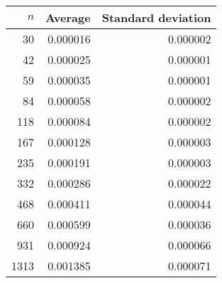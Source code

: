 \begin{tabular}{rrr}
$n$ & Average & Standard deviation\\\hline
30 & 0.000016 & 0.000002\\
42 & 0.000025 & 0.000001\\
59 & 0.000035 & 0.000001\\
84 & 0.000058 & 0.000002\\
118 & 0.000084 & 0.000002\\
167 & 0.000128 & 0.000003\\
235 & 0.000191 & 0.000003\\
332 & 0.000286 & 0.000022\\
468 & 0.000411 & 0.000044\\
660 & 0.000599 & 0.000036\\
931 & 0.000924 & 0.000066\\
1313 & 0.001385 & 0.000071\\
\end{tabular}
